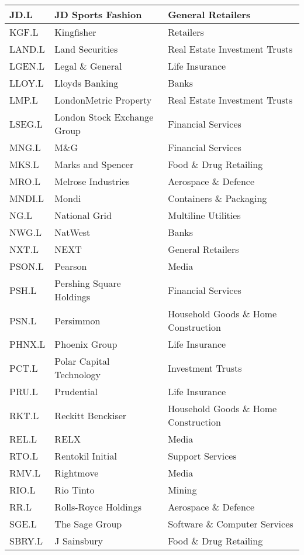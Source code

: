 \begin{longtable}{|p{2cm}|p{4cm}|p{6cm}|}
JD.L & JD Sports Fashion & General Retailers \\ \hline
KGF.L & Kingfisher & Retailers \\ \hline
LAND.L & Land Securities & Real Estate Investment Trusts \\ \hline
LGEN.L & Legal \& General & Life Insurance \\ \hline
LLOY.L & Lloyds Banking & Banks \\ \hline
LMP.L & LondonMetric Property & Real Estate Investment Trusts \\ \hline
LSEG.L & London Stock Exchange Group & Financial Services \\ \hline
MNG.L & M\&G & Financial Services \\ \hline
MKS.L & Marks and Spencer &  Food \& Drug Retailing \\ \hline
MRO.L & Melrose Industries & Aerospace \& Defence \\ \hline
MNDI.L & Mondi & Containers \& Packaging \\ \hline
NG.L & National Grid & Multiline Utilities \\ \hline
NWG.L & NatWest & Banks \\ \hline
NXT.L & NEXT & General Retailers \\ \hline
PSON.L & Pearson & Media \\ \hline
PSH.L & Pershing Square Holdings & Financial Services \\ \hline
PSN.L & Persimmon & Household Goods \& Home Construction \\ \hline
PHNX.L & Phoenix Group & Life Insurance \\ \hline
PCT.L & Polar Capital Technology & Investment Trusts \\ \hline
PRU.L & Prudential & Life Insurance \\ \hline
RKT.L & Reckitt Benckiser & Household Goods \& Home Construction \\ \hline
REL.L & RELX & Media \\ \hline
RTO.L & Rentokil Initial & Support Services \\ \hline
RMV.L & Rightmove & Media \\ \hline
RIO.L & Rio Tinto & Mining \\ \hline
RR.L & Rolls-Royce Holdings & Aerospace \& Defence \\ \hline
SGE.L & The Sage Group & Software \& Computer Services \\ \hline
SBRY.L & J Sainsbury & Food \& Drug Retailing \\ \hline

\end{longtable}
